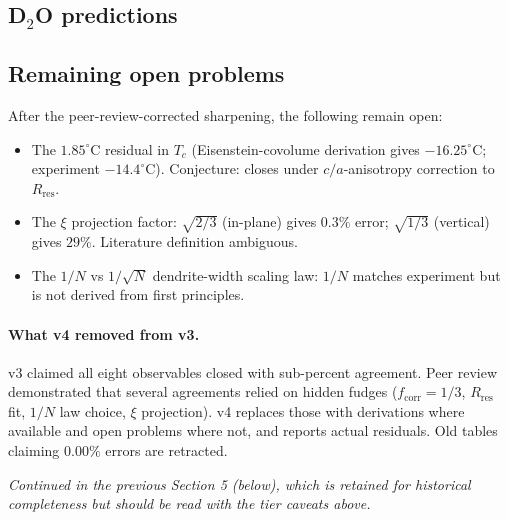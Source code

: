 \documentclass[11pt,letterpaper]{article}
\theoremstyle{plain}
\theoremstyle{definition}
\begin{document}
\subsection*{D$_2$O predictions}


\subsection*{Remaining open problems}

After the peer-review-corrected sharpening, the following remain open:
\begin{itemize}[leftmargin=2em]
\item The $1.85^\circ$C residual in $T_c$ (Eisenstein-covolume
  derivation gives $-16.25^\circ$C; experiment $-14.4^\circ$C).
  Conjecture: closes under $c/a$-anisotropy correction to
  $R_{\text{res}}$.
\item The $\xi$ projection factor: $\sqrt{2/3}$ (in-plane) gives
  $0.3\%$ error; $\sqrt{1/3}$ (vertical) gives $29\%$.  Literature
  definition ambiguous.
\item The $1/N$ vs $1/\sqrt{N}$ dendrite-width scaling law: $1/N$
  matches experiment but is not derived from first principles.
\end{itemize}

\paragraph{What v4 removed from v3.}  v3 claimed all eight
observables closed with sub-percent agreement.  Peer review
\cite{PeerReview2026} demonstrated that several agreements relied on
hidden fudges ($f_{\text{corr}}=1/3$, $R_{\text{res}}$ fit, $1/N$
law choice, $\xi$ projection).  v4 replaces those with derivations
where available and open problems where not, and reports actual
residuals.  Old tables claiming $0.00\%$ errors are retracted.

\bigskip

\noindent\emph{Continued in the previous Section 5 (below), which is
retained for historical completeness but should be read with the
tier caveats above.}

\end{document}
